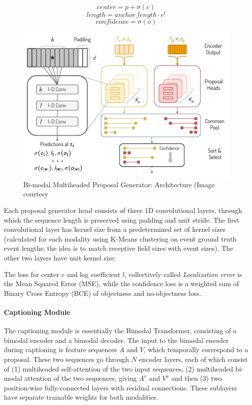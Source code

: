$$ center = p + \sigma(c) $$
$$ length = anchor\_length \cdot e^l $$
$$ confidence = \sigma(o) $$

\begin{figure}
	\centering
	\includegraphics[width=0.8\linewidth]{assets/img/bmt-proposal-generator}
	\caption{Bi-modal Multiheaded Proposal Generator: Architecture (Image courtesy \cite{iashin2020better}}
\end{figure}

\par
Each proposal generator head consists of three 1D convolutional layers, through which the 
sequence length is preserved using padding and unit stride. The first convolutional layer 
has kernel size from a predetermined set of kernel sizes (calculated for each modality using 
K-Means clustering on event ground truth event lengths; the idea is to match receptive field 
sizes with event sizes). The other two layers have unit kernel size.\par

The loss for center $c$ and log coefficient $l$, collectively called \textit{Localization 
error} is the Mean Squared Error (MSE), while the confidence loss is a weighted sum of 
Binary Cross Entropy (BCE) of objectness and no-objectness loss. \par


\paragraph{Captioning Module}
\par
The captioning module is essentially the Bimodal Transformer, consisting of a bimodal 
encoder and a bimodal decoder. The input to the bimodal encoder during captioning is feature 
sequences $A$ and $V$, which temporally correspond to a proposal. These two sequences go 
through $N$ encoder layers, each of which consist of (1) multiheaded self-attention of the 
two input sequences, (2) multiheaded bi-modal attention of the two sequences, giving $A^v$ 
and $V^a$ and then (3) two position-wise fully-connected layers with residual connections. 
These sublayers have separate trainable weights for both modalities.\par

